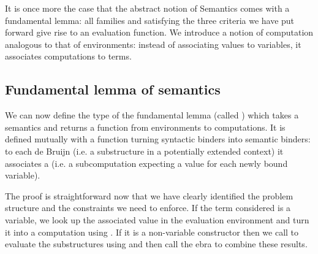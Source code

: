 \begin{center}
\end{center}

It is once more the case that the abstract notion of Semantics comes
with a fundamental lemma: all   families  and
 satisfying the three criteria we have put forward give rise
to an evaluation function. We introduce a notion of computation
 analogous to that of environments: instead of associating
values to variables, it associates computations to terms.

\begin{center}
\end{center}

\subsection{Fundamental lemma of semantics}\label{sec:fundamentallemma}

We can now define the type of the fundamental lemma (called \semfun{}) which
takes a semantics and returns a function from environments to computations.
It is defined mutually with a
function  turning syntactic binders into semantic binders: to
each de Bruijn  (i.e. a substructure in a potentially extended
context) it associates a  (i.e. a subcomputation expecting a
value for each newly bound variable).

\begin{center}
\end{center}

The \semfun{} proof is straightforward now that we have clearly
identified the problem structure and the constraints we need to enforce.
If the term considered is a variable, we look up the associated value in
the evaluation environment and turn it into a computation using .
If it is a non-variable constructor then we call  to evaluate the
substructures using  and then call the ebra to combine
these results.

